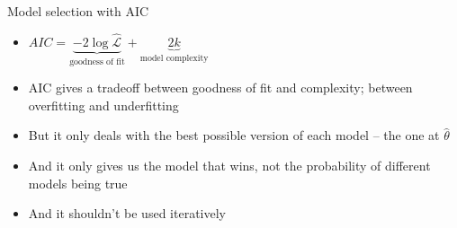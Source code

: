 \documentclass[10pt]{beamer}
\begin{document}
\begin{frame}{Model selection with AIC}
  \begin{itemize}
        \item $AIC = \underbrace{-2 \log \hat{\mathcal{L}}}_{\text{goodness of fit}} + \underbrace{2k}_{\text{model complexity}}$
        \item AIC gives a tradeoff between goodness of fit and complexity; between overfitting and underfitting
        \item But it only deals with the best possible version of each model -- the one at $\hat{\theta}$
        \item And it only gives us the model that wins, not the probability of different models being true
          \item And it shouldn't be used iteratively 
  \end{itemize}
\end{frame}
\end{document}
